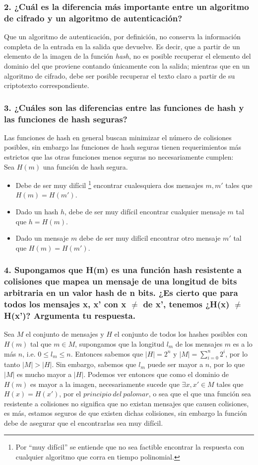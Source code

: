 \documentclass[12pt]{article}
\begin{document}
\subsubsection*{2. ¿Cuál es la diferencia más importante entre un algoritmo de cifrado y un algoritmo de autenticación?}
Que un algoritmo de autenticación, por definición, no conserva la información completa de la entrada en la salida que devuelve. Es decir, que
a partir de un elemento de la imagen de la función \textit{hash}, no es posible recuperar el elemento del dominio del que proviene contando únicamente con la salida;
mientras que en un algoritmo de cifrado, debe ser posible recuperar el texto claro a partir de su criptotexto correspondiente.

\subsubsection*{3. ¿Cuáles son las diferencias entre las funciones de hash y las funciones de hash seguras?}
Las funciones de hash en general buscan minimizar el número de colisiones posibles, sin embargo las funciones de hash seguras tienen requerimientos más estrictos que las otras funciones menos seguras no necesariamente cumplen: \\
Sea $H(m)$ una función de hash segura.
\begin{itemize}
\item Debe de ser muy difícil \footnote{Por ``muy difícil'' se entiende que no sea factible encontrar la respuesta con cualquier algoritmo que corra en tiempo polinomial.} encontrar cualesquiera dos mensajes $m, m'$ tales que $H(m) = H(m')$.
\item Dado un hash $h$, debe de ser muy difícil encontrar cualquier mensaje $m$ tal que $h = H(m)$.
\item Dado un mensaje $m$ debe de ser muy difícil encontrar otro mensaje $m'$ tal que $H(m) = H(m')$.
\end{itemize}

\subsubsection*{4. Supongamos que H(m) es una función hash resistente a colisiones que mapea un mensaje de una longitud de bits arbitraria en un valor hash de n bits. ¿Es cierto que para todos los mensajes x, x’ con x $\neq$ de x’, tenemos ¿H(x) $\neq$ H(x')? Argumenta tu respuesta.}
Sea $M$ el conjunto de mensajes y $H$ el conjunto de todos los hashes posibles con $H(m)$ tal que $m \in M$, supongamos que la longitud $l_m$ de los mensajes $m$ es a lo más $n$, i.e. $0 \leq l_m \leq n$. Entonces sabemos que $|H| = 2^n$ y $|M| = \sum_{i = 0}^n 2^i$, por lo tanto $|M| > |H|$. Sin embargo, sabemos que $l_m$ puede ser mayor a $n$, por lo que $|M|$ es mucho mayor a $|H|$. Podemos ver entonces que como el dominio de $H(m)$ es mayor a la imagen, necesariamente sucede que $\exists x, x' \in M$ tales que $H(x) = H(x')$, por el $principio\ del\ palomar$, o sea que el que una función sea resistente a colisiones no significa que no existan mensajes que causen colisiones, es más, estamos seguros de que existen dichas colisiones, sin embargo la función debe de asegurar que el encontrarlas sea muy difícil.
\end{document}
